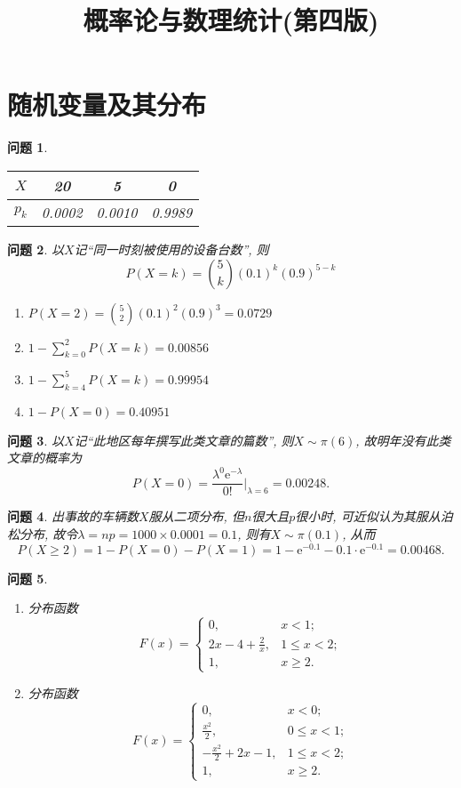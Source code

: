 \documentclass[a4paper]{article}
\newcommand{\e}{\mathrm{e}}
\newcommand{\disp}{\displaystyle}
\theoremstyle{mystyle}
\newtheorem{prob}{问题}[section]
\begin{document}
	\title{\huge \heiti 概率论与数理统计(第四版)}
	\maketitle
	\setcounter{section}{1}
	\section{\heiti 随机变量及其分布}
	\begin{prob}
		\begin{tabular}{c|ccc}
		$X$ & 20 & 5 & 0\\
		\hline
		$p_k$ & 0.0002 & 0.0010 & 0.9989
		\end{tabular}
	\end{prob}
	\setcounter{prob}{5}
	\begin{prob}
		以$X$记``同一时刻被使用的设备台数'', 则
		\[
			P(X=k)={5\choose k}(0.1)^k(0.9)^{5-k}
		\]
		\begin{enumerate}[{(}1{)}]
			\item
			$\displaystyle P(X=2)={5\choose 2}(0.1)^2(0.9)^{3}=0.0729$
			\item
			$\displaystyle 1-\sum_{k=0}^2P(X=k)=0.00856$
			\item
			$\displaystyle 1-\sum_{k=4}^5 P(X=k)=0.99954$
			\item
			$\displaystyle 1-P(X=0)=0.40951$
		\end{enumerate}
	\end{prob}
	\setcounter{prob}{10}
	\begin{prob}
		以$X$记``此地区每年撰写此类文章的篇数'', 则$X\sim \pi(6)$, 故明年没有此类文章的概率为
		\[
			P(X=0)=\frac{\lambda^0\e^{-\lambda}}{0!}\Bigg|_{\lambda=6}=0.00248.
		\]
	\end{prob}
	\setcounter{prob}{15}
	\begin{prob}
		出事故的车辆数$X$服从二项分布, 但$n$很大且$p$很小时, 可近似认为其服从泊松分布, 故令$\lambda =np=1000\times 0.0001=0.1$, 则有$X\sim\pi(0.1)$, 从而
		\[
			P(X\geqslant 2)=1-P(X=0)-P(X=1)=1-\e^{-0.1}-0.1\cdot\e^{-0.1}=0.00468.
		\]
	\end{prob}
	\setcounter{prob}{20}
	\begin{prob}
		\begin{enumerate}[{(}1{)}]
			\item
			分布函数
			\[
				F(x)=
				\begin{cases}
				0,&x<1;\\
				\disp 2x-4+\frac{2}{x}, & 1\leqslant x< 2;\\
				1, &x\geqslant2.
				\end{cases}
			\]
			\item
			分布函数
			\[
				F(x)=
				\begin{cases}
				0, & x<0;\\
				\disp\frac{x^2}{2}, & 0\leqslant x <1;\\
				\disp -\frac{x^2}{2}+2x-1, &1\leqslant x<2;\\
				1,& x\geqslant 2.
				\end{cases}
			\]
		\end{enumerate}
	\end{prob}
\end{document}
